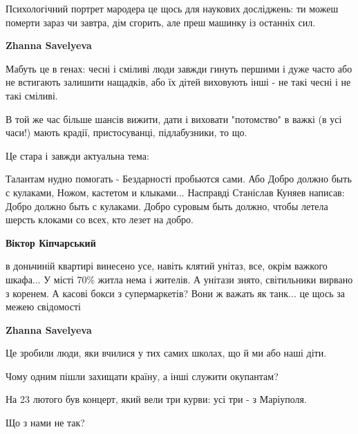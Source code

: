  
 
 
 
 

\qqSecCmt


Психологічний портрет мародера це щось для наукових досліджень: ти можеш
померти зараз чи завтра, дім сгорить, але преш машинку із останніх сил.

\begin{itemize} %
\textbf{Zhanna Savelyeva} 

Мабуть це в генах: чесні і сміливі люди завжди гинуть першими і дуже часто або
не встигають залишити нащадків, або їх дітей виховують інші - не такі чесні і
не такі сміливі.

В той же час більше шансів вижити, дати і виховати "потомство" в важкі (в усі
часи!) мають крадії, пристосуванці, підлабузники, то що.

Це стара і завжди актуальна тема:

\obeycr
Талантам нудно помогать -
Бездарності пробьются сами.
Або
Добро должно быть с кулаками,
Ножом, кастетом и клыками...
Насправді Станіслав Куняев написав:
Добро должно быть с кулаками.
Добро суровым быть должно,
чтобы летела шерсть клоками
со всех, кто лезет на добро.
\restorecr

\textbf{Віктор Кіпчарський} 

в доньчиній квартирі винесено усе, навіть клятий унітаз, все, окрім важкого
шкафа... У місті 70\% житла нема і жителів. А унітази знято, світильники вирвано
з коренем. А касові бокси з супермаркетів? Вони ж важать як танк... це щось за
межею свідомості

\textbf{Zhanna Savelyeva} 

Це зробили люди, яки вчилися у тих самих школах, що й ми або наші діти.

Чому одним пішли захищати країну, а інші служити окупантам?

На 23 лютого був концерт, який вели три курви: усі три - з Маріуполя.

Що з нами не так?


\end{itemize}
